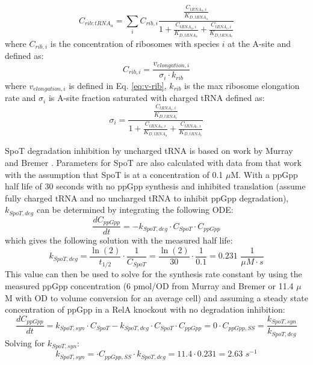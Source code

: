 \documentclass[12pt]{article}
\begin{document}
\begin{equation}
C_{rib:tRNA_u} = \sum\limits_i C_{rib, i} \frac{\frac{C_{tRNA_u, i}}{K_{D, tRNA_u}}}{1 + \frac{C_{tRNA_u, i}}{K_{D, tRNA_u}} + \frac{C_{tRNA_c, i}}{K_{D, tRNA_c}}}
\end{equation}
where $C_{rib,i}$ is the concentration of ribosomes with species $i$ at the A-site and defined as:
\begin{equation}
C_{rib,i} = \frac{v_{elongation, i}}{\sigma_i \cdot k_{rib}}
\end{equation}
where $v_{elongation, i}$ is defined in Eq. \ref{eq:v-rib}, $k_{rib}$ is the max ribosome elongation rate and $\sigma_i$ is A-site fraction saturated with charged tRNA defined as:
\begin{equation}
\sigma_i = \frac{\frac{C_{tRNA_c, i}}{K_{D, tRNA_c}}}{1 + \frac{C_{tRNA_u, i}}{K_{D, tRNA_u}} + \frac{C_{tRNA_c, i}}{K_{D, tRNA_c}}}
\end{equation}

SpoT degradation inhibition by uncharged tRNA is based on work by Murray and Bremer \cite{murray1996control}.  Parameters for SpoT are also calculated with data from that work with the assumption that SpoT is at a concentration of 0.1 $\mu$M.  With a ppGpp half life of 30 seconds with no ppGpp synthesis and inhibited translation (assume fully charged tRNA and no uncharged tRNA to inhibit ppGpp degradation), $k_{SpoT, deg}$ can be determined by integrating the following ODE:
\begin{equation}
\frac{dC_{ppGpp}}{dt} = -k_{SpoT, deg} \cdot C_{SpoT} \cdot C_{ppGpp}
\end{equation}
which gives the following solution with the measured half life:
\begin{equation}
k_{SpoT, deg} = \frac{\ln(2)}{t_{1/2}}\cdot\frac{1}{C_{SpoT}} = \frac{\ln(2)}{30}\cdot\frac{1}{0.1} = 0.231 \hspace{4pt} \frac{1}{\mu M \cdot s}
\end{equation}
This value can then be used to solve for the synthesis rate constant by using the measured ppGpp concentration (6 pmol/OD from Murray and Bremer or 11.4 $\mu$M with OD to volume conversion for an average cell) and assuming a steady state concentration of ppGpp in a RelA knockout with no degradation inhibition:
\begin{equation}
\frac{dC_{ppGpp}}{dt} = k_{SpoT, syn} \cdot C_{SpoT} - k_{SpoT, deg} \cdot C_{SpoT} \cdot C_{ppGpp} = 0
\cdot C_{ppGpp, SS} = \frac{k_{SpoT, syn}}{k_{SpoT, deg}}
\end{equation}
Solving for $k_{SpoT, syn}$:
\begin{equation}
k_{SpoT, syn} = \cdot C_{ppGpp, SS} \cdot k_{SpoT, deg} = 11.4 \cdot 0.231 = 2.63 \hspace{4pt} s^{-1}
\end{equation}
\end{document}
